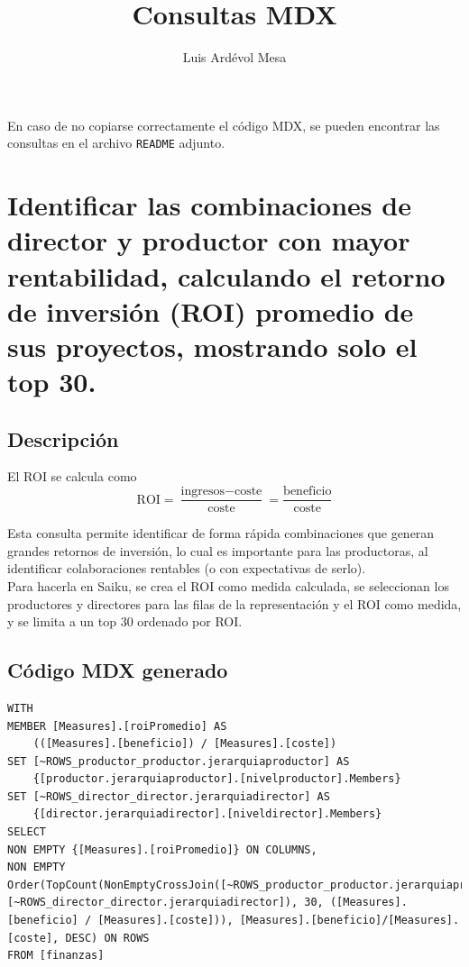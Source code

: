 \documentclass[11pt]{opticajnl}
\title{Consultas MDX}
\author[1,2,3]{Luis Ardévol Mesa}
\begin{document}
\maketitle

En caso de no copiarse correctamente el código MDX, se pueden encontrar las consultas en el archivo \texttt{README} adjunto.

\section{Identificar las combinaciones de director y productor con mayor rentabilidad, calculando el retorno de inversión (ROI) promedio de sus proyectos, mostrando solo el top 30.}

\subsection{Descripción}

El ROI se calcula como 
\begin{equation*}
\text{ROI} = \frac{\text{ingresos} - \text{coste}}{\text{coste}} = \frac{\text{beneficio}}{\text{coste}}
\end{equation*}

Esta consulta permite identificar de forma rápida combinaciones que generan grandes retornos de inversión, lo cual es importante para las productoras, al identificar colaboraciones rentables (o con expectativas de serlo). \\

Para hacerla en Saiku, se crea el ROI como medida calculada, se seleccionan los productores y directores para las filas de la representación y el ROI como medida, y se limita a un top 30 ordenado por ROI.

\subsection{Código MDX generado}
\begin{lstlisting}[style=terminal]
WITH
MEMBER [Measures].[roiPromedio] AS
	(([Measures].[beneficio]) / [Measures].[coste])
SET [~ROWS_productor_productor.jerarquiaproductor] AS
	{[productor.jerarquiaproductor].[nivelproductor].Members}
SET [~ROWS_director_director.jerarquiadirector] AS
	{[director.jerarquiadirector].[niveldirector].Members}
SELECT
NON EMPTY {[Measures].[roiPromedio]} ON COLUMNS,
NON EMPTY Order(TopCount(NonEmptyCrossJoin([~ROWS_productor_productor.jerarquiaproductor], [~ROWS_director_director.jerarquiadirector]), 30, ([Measures].[beneficio] / [Measures].[coste])), [Measures].[beneficio]/[Measures].[coste], DESC) ON ROWS
FROM [finanzas]
\end{lstlisting}
\end{document}
